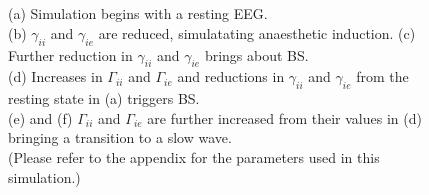 \documentclass[a4paper,12pt]{article}
\begin{document}
\begin{figure}
{\\
\\
(a) Simulation begins with a resting EEG.\\ 
(b) $\gamma_{ii}$ and $\gamma_{ie}$ are reduced, simulatating anaesthetic induction. (c) Further reduction in $\gamma_{ii}$ and $\gamma_{ie}$ brings about BS.\\
(d) Increases in $\Gamma_{ii}$ and $\Gamma_{ie}$ and reductions in $\gamma_{ii}$ and $\gamma_{ie}$ from the resting state in (a) triggers BS. \\
(e) and (f) $\Gamma_{ii}$ and $\Gamma_{ie}$ are further increased from their values in (d) bringing a transition to a slow wave.\\
(Please refer to the appendix for the parameters used in this simulation.)
}
\end{figure}
\end{document}
